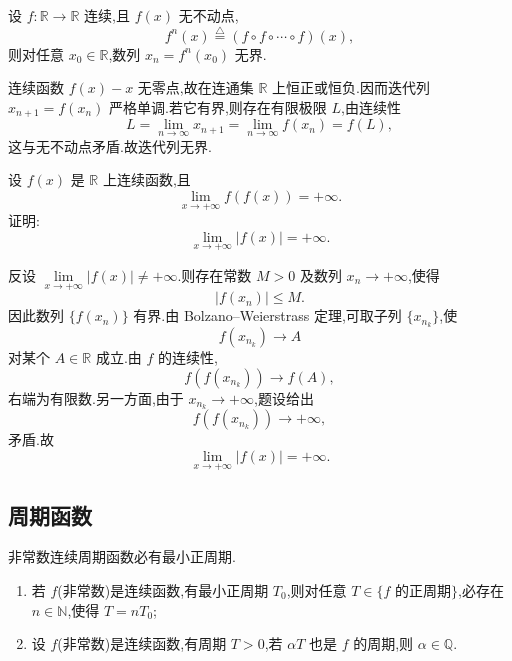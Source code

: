 \begin{example}
    设 $f:\mathbb{R}\to\mathbb{R}$ 连续,且 $f(x)$ 无不动点,
    \[
        f^n(x)\overset{\triangle}{=}(f\circ f\circ\cdots\circ f)(x),
    \]
    则对任意 $x_0\in\mathbb{R}$,数列 $x_n=f^n(x_0)$ 无界.
\end{example}
\exampleblank

\begin{solution}
    连续函数 $f(x)-x$ 无零点,故在连通集 $\mathbb{R}$ 上恒正或恒负.因而迭代列 $x_{n+1}=f(x_n)$ 严格单调.若它有界,则存在有限极限 $L$,由连续性
    \[
        L=\lim\limits_{n\to\infty}x_{n+1} =\lim\limits_{n\to\infty}f(x_n)=f(L),
    \]
    这与无不动点矛盾.故迭代列无界.
\end{solution}

\begin{example}
    设 $f(x)$ 是 $\mathbb{R}$ 上连续函数,且
    \[
        \lim\limits_{x\to+\infty}f(f(x))=+\infty.
    \]
    证明:
    \[
        \lim\limits_{x\to+\infty}|f(x)|=+\infty.
    \]
\end{example}
\exampleblank

\begin{solution}
    反设 $\displaystyle\lim\limits_{x\to+\infty}|f(x)|\neq+\infty$.则存在常数 $M>0$ 及数列 $x_n\to+\infty$,使得
    \[
        |f(x_n)|\leq M.
    \]
    因此数列 $\{f(x_n)\}$ 有界.由 Bolzano--Weierstrass 定理,可取子列 $\{x_{n_k}\}$,使
    \[
        f(x_{n_k})\to A
    \]
    对某个 $A\in\mathbb{R}$ 成立.由 $f$ 的连续性,
    \[
        f(f(x_{n_k}))\to f(A),
    \]
    右端为有限数.另一方面,由于 $x_{n_k}\to+\infty$,题设给出
    \[
        f(f(x_{n_k}))\to+\infty,
    \]
    矛盾.故
    \[
        \lim\limits_{x\to+\infty}|f(x)|=+\infty.
    \]
\end{solution}


\subsection{周期函数}

\begin{proposition}[\markstar]
    非常数连续周期函数必有最小正周期.
\end{proposition}

\begin{corollary}[\markstar]
    \leavevmode
    \begin{enumerate}
        \item 若 $f$(非常数)是连续函数,有最小正周期 $T_0$,则对任意 $T\in\{f\text{ 的正周期}\}$,必存在 $n\in\mathbb{N}$,使得 $T=nT_0$;
        \item 设 $f$(非常数)是连续函数,有周期 $T>0$,若 $\alpha T$ 也是 $f$ 的周期,则 $\alpha\in\mathbb{Q}$.
    \end{enumerate}
\end{corollary}

